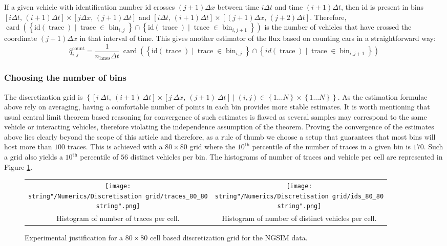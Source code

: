 \documentclass[preprint]{elsarticle}
\DeclareMathOperator{\card}{card}
\DeclareMathOperator{\trc}{trace}
\DeclareMathOperator{\bin}{bin}
\DeclareMathOperator{\lns}{lanes}
\DeclareMathOperator{\cnt}{count}
\begin{document}
If a given vehicle with identification number id crosses $\left(j+1\right)\Delta x$
between time $i\Delta t$ and time $\left(i+1\right)\Delta t$,
then id is present in bins $\left[i\Delta t,\,\left(i+1\right)\Delta t\right]\times\left[j\Delta x,\,\left(j+1\right)\Delta t\right]$
and $\left[i\Delta t,\,\left(i+1\right)\Delta t\right]\times\left[\left(j+1\right)\Delta x,\,\left(j+2\right)\Delta t\right]$.
Therefore, $\card\left(\left\{ \text{id}\left(\trc \right)\mid \trc \in \bin_{i,j}\right\} \cap\left\{ \text{id} \left(\trc\right)\mid \trc\in \bin_{i,j+1}\right\} \right)$
is the number of vehicles that have crossed the coordinate $\left(j+1\right)\Delta x$
in that interval of time. This gives another estimator of the flux
based on counting cars in a straightforward way: 
\[
\widehat{q}_{i,j}^{\cnt}=\frac{1}{n_{\lns}\Delta t}\: \card\left(\left\{ \text{id} \left(\trc\right)\mid \trc \in \bin_{i,j}\right\} \cap\left\{ id\left( \trc \right)\mid \trc\in \bin_{i,j+1}\right\} \right)
\]



\subsubsection{Choosing the number of bins}

The discretization grid is $\left\{ \left[i\:\Delta t,\:\left(i+1\right)\:\Delta t\right]\times\left[j\:\Delta x,\:\left(j+1\right)\:\Delta t\right]\mid\left(i,j\right)\in\left\{ 1\ldots N\right\} \times\left\{ 1\ldots N\right\} \right\} $.
As the estimation formulae above rely on averaging, having a comfortable
number of points in each bin provides more stable estimates. It is
worth mentioning that usual central limit theorem based reasoning
for convergence of such estimates is flawed as several samples may
correspond to the same vehicle or interacting vehicles, therefore
violating the independence assumption of the theorem. Proving the
convergence of the estimates above lies clearly beyond the scope of
this article and therefore, as a rule of thumb we choose a setup that
guarantees that most bins will host more than $100$ traces. This
is achieved with a $80\times80$ grid where the $10^{\text{th}}$ percentile
of the number of traces in a given bin is $170$. Such a grid also
yields a $10^{\text{th}}$ percentile of $56$ distinct vehicles per bin.
The histograms of number of traces and vehicle per cell are represented
in Figure \ref{fig:Grid control}.

\begin{figure}[H]
\centering
\begin{tabular}{cc}
\texttt{[image: \\string"/Numerics/Discretisation grid/traces\_80\_80\\string".png]} & \texttt{[image: \\string"/Numerics/Discretisation grid/ids\_80\_80\\string".png]}\tabularnewline
Histogram of number of traces per cell. & Histogram of number of distinct vehicles per cell. \tabularnewline
\end{tabular}
\caption{Experimental justification for a $80\times 80$ cell based discretization
grid for the NGSIM data.}
\label{fig:Grid control}
\end{figure}
\end{document}
